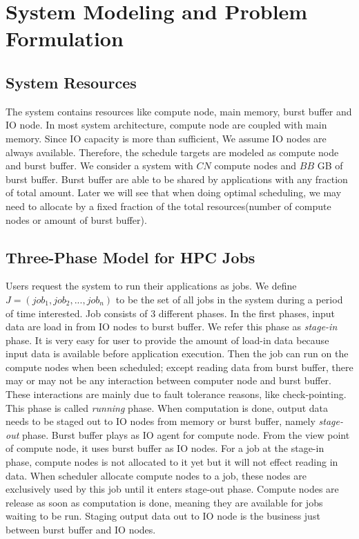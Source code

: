 \section{System Modeling and Problem Formulation}
\label{Sec:Model}

\subsection{System Resources}
The system contains resources like compute node, main memory, burst buffer and IO node.
In most system architecture, compute node are coupled with main memory.
Since IO capacity is more than sufficient, We assume IO nodes are always available.
Therefore, the schedule targets are modeled as compute node and burst buffer.
We consider a system with $CN$ compute nodes and $BB$ GB of burst buffer.
Burst buffer are able to be shared by applications with any fraction of total amount.
Later we will see that when doing optimal scheduling, we may need to allocate by a fixed
fraction of the total resources(number of compute nodes or amount of burst buffer).

\subsection{Three-Phase Model for HPC Jobs}
Users request the system to run their applications as jobs.
We define $J = (job_1, job_2,..., job_n)$ to be the set of all jobs in the system during
a period of time interested.
Job consists of 3 different phases.
In the first phases, input data are load in from IO nodes to burst buffer.
We refer this phase as \textit{stage-in} phase.
It is very easy for user to provide the amount of load-in data because input data is available before application execution. 
Then the job can run on the compute nodes when been scheduled;
except reading data from burst buffer, there may or may not be any interaction between computer node and burst buffer.
These interactions are mainly due to fault tolerance reasons, like check-pointing.
This phase is called \textit{running} phase.
When computation is done, output data needs to be staged out to IO nodes from memory or burst buffer, namely \textit{stage-out} phase.
Burst buffer plays as IO agent for compute node.
From the view point of compute node, it uses burst buffer as IO nodes.
For a job at the stage-in phase, compute nodes is not allocated to it yet but it will not effect reading in data.
When scheduler allocate compute nodes to a job, these nodes are exclusively used by this job until it enters stage-out phase.
Compute nodes are release as soon as computation is done, meaning they are available for jobs waiting to be run.
Staging output data out to IO node is the business just between burst buffer and IO nodes.


